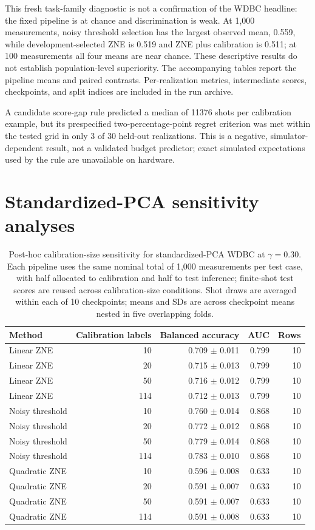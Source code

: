 \documentclass[10pt]{article}
\begin{document}
This fresh task-family diagnostic is not a confirmation of the WDBC headline: the fixed pipeline is at chance and discrimination is weak. At 1,000 measurements, noisy threshold selection has the largest observed mean, 0.559, while development-selected ZNE is 0.519 and ZNE plus calibration is 0.511; at 100 measurements all four means are near chance. These descriptive results do not establish population-level superiority. The accompanying tables report the pipeline means and paired contrasts. Per-realization metrics, intermediate scores, checkpoints, and split indices are included in the run archive.

A candidate score-gap rule predicted a median of 11376 shots per calibration example, but its prespecified two-percentage-point regret criterion was met within the tested grid in only 3 of 30 held-out realizations. This is a negative, simulator-dependent result, not a validated budget predictor; exact simulated expectations used by the rule are unavailable on hardware.

\clearpage
\section*{Standardized-PCA sensitivity analyses}

\begin{table}[t]\centering\scriptsize
\caption{Post-hoc calibration-size sensitivity for standardized-PCA WDBC at $\gamma=0.30$. Each pipeline uses the same nominal total of 1,000 measurements per test case, with half allocated to calibration and half to test inference; finite-shot test scores are reused across calibration-size conditions. Shot draws are averaged within each of 10 checkpoints; means and SDs are across checkpoint means nested in five overlapping folds.}
\label{tab:calsize}
\begin{tabular}{@{}l r r r r@{}}\toprule
Method & Calibration labels & Balanced accuracy & AUC & Rows \\ \midrule
Linear ZNE & 10 & 0.709 $\pm$ 0.011 & 0.799 & 10 \\
Linear ZNE & 20 & 0.715 $\pm$ 0.013 & 0.799 & 10 \\
Linear ZNE & 50 & 0.716 $\pm$ 0.012 & 0.799 & 10 \\
Linear ZNE & 114 & 0.712 $\pm$ 0.013 & 0.799 & 10 \\
Noisy threshold & 10 & 0.760 $\pm$ 0.014 & 0.868 & 10 \\
Noisy threshold & 20 & 0.772 $\pm$ 0.012 & 0.868 & 10 \\
Noisy threshold & 50 & 0.779 $\pm$ 0.014 & 0.868 & 10 \\
Noisy threshold & 114 & 0.783 $\pm$ 0.010 & 0.868 & 10 \\
Quadratic ZNE & 10 & 0.596 $\pm$ 0.008 & 0.633 & 10 \\
Quadratic ZNE & 20 & 0.591 $\pm$ 0.007 & 0.633 & 10 \\
Quadratic ZNE & 50 & 0.591 $\pm$ 0.007 & 0.633 & 10 \\
Quadratic ZNE & 114 & 0.591 $\pm$ 0.008 & 0.633 & 10 \\
\bottomrule\end{tabular}\end{table}
\end{document}
